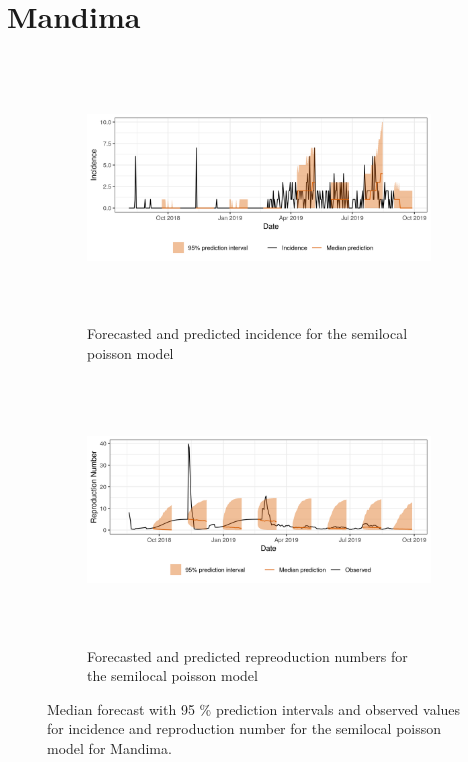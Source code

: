  \section{ Mandima }\begin{figure}[H]\begin{subfigure}{\textwidth}  \centering  \includegraphics[width=0.9\linewidth, height=7cm]{../output/Mandima_predictions.png}  \caption{Forecasted and predicted incidence for the semilocal poisson model}\end{subfigure}

\begin{subfigure}{\textwidth}  \centering  \includegraphics[width=0.9\linewidth, height=7cm]{../output/Mandima_Rs.png}  \caption{Forecasted and predicted repreoduction numbers for the semilocal poisson model}\end{subfigure}  \caption{Median forecast with 95 \% prediction intervals and observed values for incidence and reproduction number for the semilocal poisson model for Mandima.}\end{figure}

